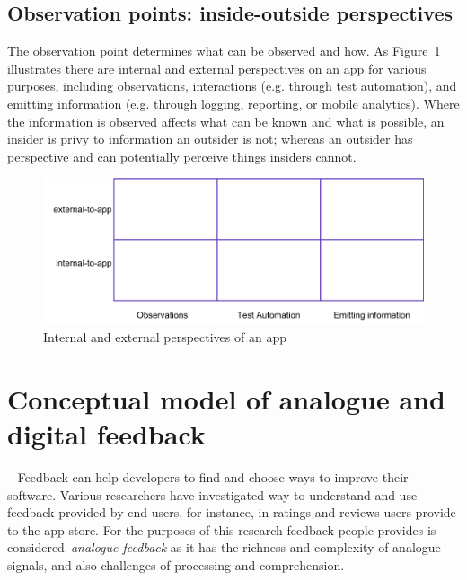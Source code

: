 \subsection{Observation points: inside-outside perspectives}
The observation point determines what can be observed and how. 
As Figure~\ref{fig:internal-external-table} illustrates there are internal and external perspectives on an app for various purposes, including observations, interactions (e.g. through test automation), and emitting information (e.g. through logging, reporting, or mobile analytics). Where the information is observed affects what can be known and what is possible, an insider is privy to information an outsider is not; whereas an outsider has perspective and can potentially perceive things insiders cannot.

\begin{figure}[ht]
    \centering
    \includegraphics[width=13cm]{images/internal-external-table.png}
    \caption{Internal and external perspectives of an app}
    \label{fig:internal-external-table}
\end{figure}


\section{Conceptual model of analogue and digital feedback}~\label{analogue-and-digital-feedback}
Feedback can help developers to find and choose ways to improve their software. Various researchers have investigated way to understand and use feedback provided by end-users, for instance, in ratings and reviews users provide to the app store. For the purposes of this research feedback people provides is considered~\emph{analogue feedback} as it has the richness and complexity of analogue signals, and also challenges of processing and comprehension.

